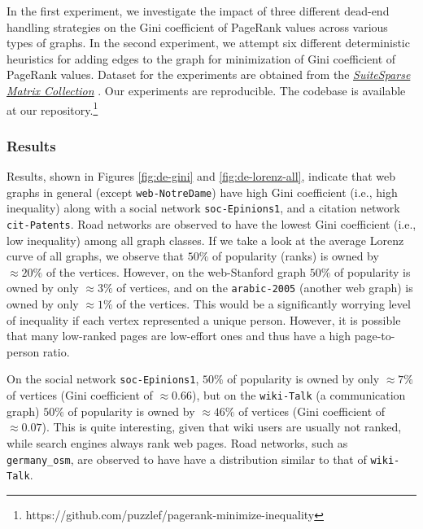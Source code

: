 In the first experiment, we investigate the impact of three different dead-end handling strategies on the Gini coefficient of PageRank values across various types of graphs. In the second experiment, we attempt six different deterministic heuristics for adding edges to the graph for minimization of Gini coefficient of PageRank values. Dataset for the experiments are obtained from the \href{https://sparse.tamu.edu}{\textit{SuiteSparse Matrix Collection}} \cite{suite19}. Our experiments are reproducible. The codebase is available at our repository.\footnote{https://github.com/puzzlef/pagerank-minimize-inequality}




\subsubsection{Results}

Results, shown in Figures \ref{fig:de-gini} and \ref{fig:de-lorenz-all}, indicate that web graphs in general (except \verb|web-NotreDame|) have high Gini coefficient (i.e., high inequality) along with a social network \verb|soc-Epinions1|, and a citation network \verb|cit-Patents|. Road networks are observed to have the lowest Gini coefficient (i.e., low inequality) among all graph classes. If we take a look at the average Lorenz curve of all graphs, we observe that $50\%$ of popularity (ranks) is owned by $\approx20\%$ of the vertices. However, on the web-Stanford graph $50\%$ of popularity is owned by only $\approx3\%$ of vertices, and on the \verb|arabic-2005| (another web graph) is owned by only $\approx1\%$ of the vertices. This would be a significantly worrying level of inequality if each vertex represented a unique person. However, it is possible that many low-ranked pages are low-effort ones and thus have a high page-to-person ratio.

On the social network \verb|soc-Epinions1|, $50\%$ of popularity is owned by only $\approx7\%$ of vertices (Gini coefficient of $\approx0.66$), but on the \verb|wiki-Talk| (a communication graph) $50\%$ of popularity is owned by $\approx46\%$ of vertices (Gini coefficient of $\approx0.07$). This is quite interesting, given that wiki users are usually not ranked, while search engines always rank web pages. Road networks, such as \verb|germany_osm|, are observed to have have a distribution similar to that of \verb|wiki-Talk|.





